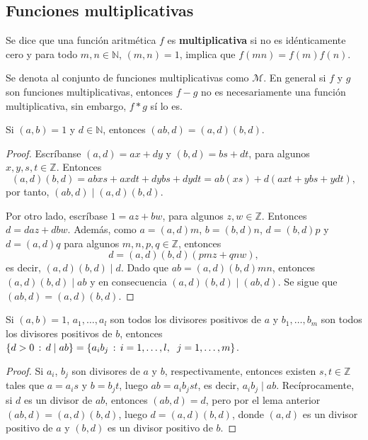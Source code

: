 \subsection{Funciones multiplicativas}

\begin{definition}\label{def:mul1}
Se dice que una función aritmética $f$ es \textbf{multiplicativa} si no es idénticamente cero y para todo $m,n \in \mathbb{N}$, $(m,n)=1$, implica que $f(m n)=f(m)f(n)$.
\end{definition}

\begin{remark}
Se denota al conjunto de funciones multiplicativas como $\mathcal{M}$. En general si $f$ y $g$ son funciones multiplicativas, entonces $f-g$ no es necesariamente una función multiplicativa, sin embargo, $f*g$ sí lo es.
\end{remark}

\begin{lemma}
Si $(a,b)=1$ y $d \in \mathbb{N}$, entonces $(a b,d)=(a,d)(b,d)$.
\end{lemma}
\begin{proof}
Escríbanse $(a,d)=a x+d y$ y $(b,d)=b s+d t$, para algunos $x,y,s,t \in \mathbb{Z}$. Entonces
\begin{equation*}
	(a,d)(b,d) = a b x s + a x d t + d y b s + d y d t = a b (xs) + d(a x t + y b s + y d t),
\end{equation*}
por tanto, $(a b,d) \mid (a,d)(b,d)$. 
\bigskip

Por otro lado, escríbase $1=a z + b w$, para algunos $z,w \in \mathbb{Z}$. Entonces $d=d a z + d b w$. Además, como $a=(a,d)m$, $b=(b,d)n$, $d=(b,d)p$ y $d=(a,d)q$ para algunos $m,n,p,q \in \mathbb{Z}$, entonces
\begin{equation*}
    d = (a,d)(b,d) (p m z + q n w),
\end{equation*}
es decir, $(a,d)(b,d) \mid d$. Dado que $a b=(a,d)(b,d)m n$, entonces $(a,d)(b,d) \mid a b$ y en consecuencia $(a,d)(b,d) \mid (a b,d)$. Se sigue que $(a b,d)=(a,d)(b,d)$.
\end{proof}

\begin{lemma}\label{lem:div1}
Si $(a,b)=1$, $a_1,\ldots,a_l$ son todos los divisores positivos de $a$ y $b_1,\ldots,b_m$ son todos los divisores positivos de $b$, entonces $\{ d>0 \, : \, d \mid a b \}=\{ a_i b_j \, : \, i=1,\ldots,l, \hspace{0.2cm} j=1,\ldots,m \}$.
\end{lemma}
\begin{proof}
Si $a_i$, $b_j$ son divisores de $a$ y $b$, respectivamente, entonces existen $s,t \in \mathbb{Z}$ tales que $a=a_i s$ y $b=b_j t$, luego $a b=a_i b_j s t$, es decir, $a_i b_j \mid a b$. Recíprocamente, si $d$ es un divisor de $a b$, entonces $(a b,d)=d$, pero por el lema anterior $(a b,d)=(a,d)(b,d)$, luego $d=(a,d)(b,d)$, donde $(a,d)$ es un divisor positivo de $a$ y $(b,d)$ es un divisor positivo de $b$.
\end{proof}


